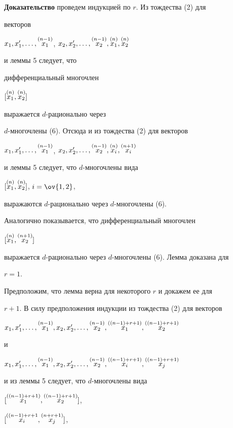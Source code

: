 {\bf Доказательство} проведем индукцией по $r$. Из тождества (2) для


векторов


$x_1,x'_1,\dotsc,\up{(n-1)}{x_1}$, $x_2,x'_2,\dotsc,




\up{(n-1)}{x_2},\up{(n)}{x_1},\up{(n)}{x_2}$


и леммы 5 следует, что


дифференциальный многочлен


$[\overset{(n)}{x_1}{},\overset{(n)}{x_2}{}]$


выражается $d$-рационально через


$d$-многочлены (6). Отсюда и из тождества (2) для векторов


$x_1,x'_1,\dotsc,\up{(n-1)}{x_1}$, $x_2,x'_2,\dotsc,




\up{(n-1)}{x_2},\up{(n)}{x_i},\up{(n+1)}{x_i}$


и леммы 5 следует, что $d$-многочлены вида


$[\overset{(n)}{x_1}{},\overset{(n)}{x_2}{}]$, $i=\ov{1,2}$,


выражаются $d$-рационально через $d$-многочлены (6).


Аналогично показывается, что дифференциальный многочлен


$[\overset{(n)}{x_1}{},\overset{(n+1)}{x_2}{}]$


выражается $d$-рационально через $d$-многочлены (6). Лемма доказана для 


$r=1$.





Предположим, что лемма верна для некоторого $r$ и докажем ее для 


$r+1$. В силу предположения индукции из тождества (2) для векторов


$x_1,x'_1,\dotsc,\up{(n-1)}{x_1},x_2,x'_2,\dotsc,


\up{(n-1)}{x_2},\up{((n-1)+r+1)}{x_1},\up{((n-1)+r+1)}{x_2}$


и


$x_1,x'_1,\dotsc,\up{(n-1)}{x_1},x_2,x'_2,\dotsc,


\up{(n-1)}{x_2},\up{((n-1)+r+1)}{x_i},\up{((n-1)+r+1)}{x_j}$


и из леммы 5 следует, что $d$-многочлены вида


$[\overset{((n-1)+r+1)}{x_1}{},\overset{((n-1)+r+1)}{x_2}{}]$,


$[\overset{((n-1)+r+1}{x_i}{},\overset{(n+r+1)}{x_j}{}]$,


